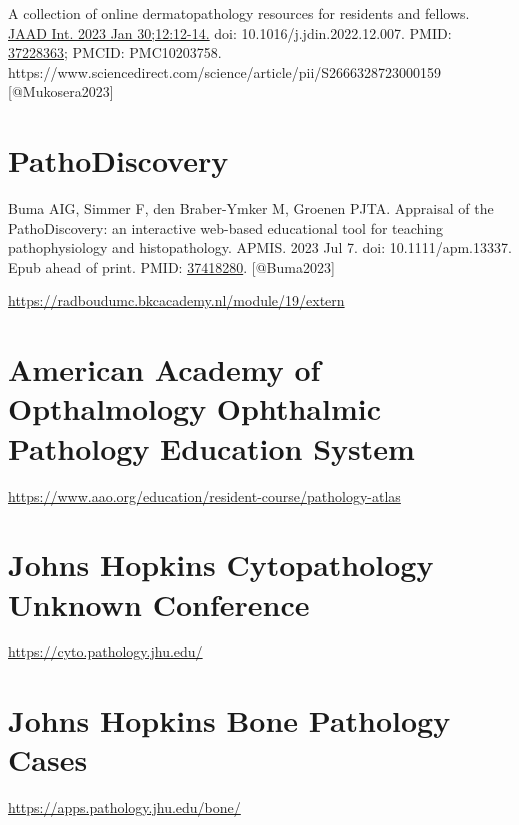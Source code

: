 \documentclass[
  letterpaper,
  DIV=11,
  numbers=noendperiod]{scrreprt}
\begin{document}
A collection of online dermatopathology resources for residents and
fellows.
\href{https://www.jaadinternational.org/article/S2666-3287(23)00015-9/fulltext}{JAAD
Int. 2023 Jan 30;12:12-14.} doi: 10.1016/j.jdin.2022.12.007. PMID:
\href{https://pubmed.ncbi.nlm.nih.gov/37228363/}{37228363}; PMCID:
PMC10203758.
https://www.sciencedirect.com/science/article/pii/S2666328723000159
{[}@Mukosera2023{]}

\hypertarget{pathodiscovery}{%
\section{PathoDiscovery}\label{pathodiscovery}}

Buma AIG, Simmer F, den Braber-Ymker M, Groenen PJTA. Appraisal of the
PathoDiscovery: an interactive web-based educational tool for teaching
pathophysiology and histopathology. APMIS. 2023 Jul 7. doi:
10.1111/apm.13337. Epub ahead of print. PMID:
\href{https://pubmed.ncbi.nlm.nih.gov/37418280/}{37418280}.
{[}@Buma2023{]}

\url{https://radboudumc.bkcacademy.nl/module/19/extern}

\hypertarget{american-academy-of-opthalmology-ophthalmic-pathology-education-system}{%
\section{American Academy of Opthalmology Ophthalmic Pathology Education
System}\label{american-academy-of-opthalmology-ophthalmic-pathology-education-system}}

\url{https://www.aao.org/education/resident-course/pathology-atlas}

\hypertarget{johns-hopkins-cytopathology-unknown-conference}{%
\section{Johns Hopkins Cytopathology Unknown
Conference}\label{johns-hopkins-cytopathology-unknown-conference}}

\url{https://cyto.pathology.jhu.edu/}

\hypertarget{johns-hopkins-bone-pathology-cases}{%
\section{Johns Hopkins Bone Pathology
Cases}\label{johns-hopkins-bone-pathology-cases}}

\url{https://apps.pathology.jhu.edu/bone/}
\end{document}

